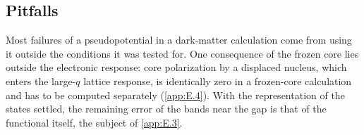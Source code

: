 \subsection{Pitfalls}

Most failures of a pseudopotential in a dark-matter calculation come from using it outside the conditions it was tested for. One consequence of the frozen core lies outside the electronic response: core polarization by a displaced nucleus, which enters the large-$q$ lattice response, is identically zero in a frozen-core calculation and has to be computed separately (\cref{app:E.4}). With the representation of the states settled, the remaining error of the bands near the gap is that of the functional itself, the subject of \cref{app:E.3}.
